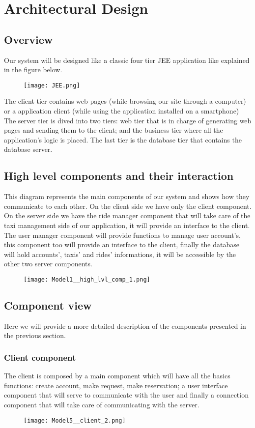 \section{Architectural Design}

\subsection{Overview}
	Our system will be designed like a classic four tier JEE application like explained in the figure below.
	\begin{figure}[h!]
		\centering
		\texttt{[image: JEE.png]}
	\end{figure}
	
	The client tier contains web pages (while browsing our site through a computer) or a application client (while using the application installed on a smartphone)
	The server tier is dived into two tiers: web tier that is in charge of generating web pages and sending them to the client; and the business tier where all the application's logic is placed. 
	The last tier is the database tier that contains the database server.
		
\subsection{High level components and their interaction}
	This diagram represents the main components of our system and shows how they communicate to each other. On the client side we have only the client component. 
	On the server side we have the ride manager component that will take care of the taxi management side of our application, it will provide an interface to the client. The user manager component will provide functions to manage user account's, this component too will provide an interface to the client, finally the database will hold accounts', taxis' and rides' informations, it will be accessible by the other two server components.
	\begin{figure}[h!]
		\centering
		\texttt{[image: Model1\_\_high\_lvl\_comp\_1.png]}
	\end{figure}
	\newpage
	
\subsection{Component view}
	Here we will provide a more detailed description of the components presented in the previous section.
	\subsubsection{Client component}
	The client is composed by a main component which will have all the basics functions: create account, make request, make reservation; a user interface component that will serve to communicate with the user and finally a connection component that will take care of communicating with the server.
		\begin{figure}[h!]
			\centering
			\texttt{[image: Model5\_\_client\_2.png]}
		\end{figure}
		\newpage

